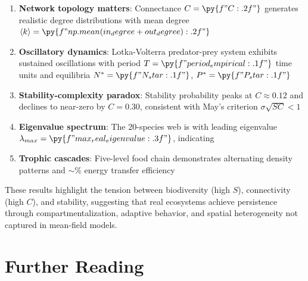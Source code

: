 \documentclass[a4paper, 11pt]{article}
\begin{document}
\begin{enumerate}
\item \textbf{Network topology matters}: Connectance $C = \py{f"{C:.2f}"}$ generates realistic degree distributions with mean degree $\langle k \rangle = \py{f"{np.mean(in_degree + out_degree):.2f}"}$

\item \textbf{Oscillatory dynamics}: Lotka-Volterra predator-prey system exhibits sustained oscillations with period $T = \py{f"{period_empirical:.1f}"}$ time units and equilibria $N^* = \py{f"{N_star:.1f}"}$, $P^* = \py{f"{P_star:.1f}"}$

\item \textbf{Stability-complexity paradox}: Stability probability peaks at $C \approx 0.12$ and declines to near-zero by $C = 0.30$, consistent with May's criterion $\sigma\sqrt{SC} < 1$

\item \textbf{Eigenvalue spectrum}: The 20-species web is  with leading eigenvalue $\lambda_{max} = \py{f"{max_real_eigenvalue:.3f}"}$, indicating 

\item \textbf{Trophic cascades}: Five-level food chain demonstrates alternating density patterns and $\sim$\% energy transfer efficiency
\end{enumerate}

These results highlight the tension between biodiversity (high $S$), connectivity (high $C$), and stability, suggesting that real ecosystems achieve persistence through compartmentalization, adaptive behavior, and spatial heterogeneity not captured in mean-field models.

\section*{Further Reading}
\end{document}
